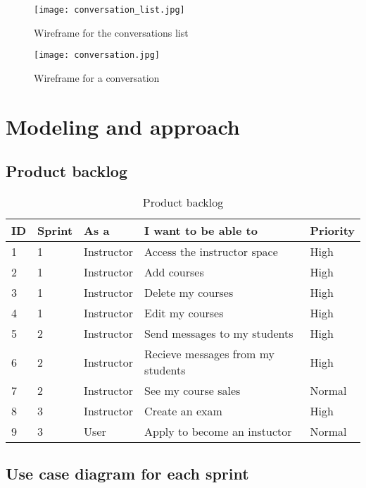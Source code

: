 \begin{figure}[!ht]
    \centering
    \texttt{[image: conversation\_list.jpg]}
    \caption{Wireframe for the conversations list}
    \label{fig:conversation_list}
\end{figure}


\vfill
\clearpage

\begin{figure}[!ht]
    \centering
    \texttt{[image: conversation.jpg]}
    \caption{Wireframe for a conversation}
    \label{fig:conversation}
\end{figure}


\section{Modeling and approach}

\subsection{Product backlog}
\begin{table}[H]
\centering
\caption{Product backlog}
\begin{tabular}{|p{1cm}|p{1.5cm}|p{3cm}|p{6cm}|p{2cm}|}
\hline
\rowcolor{brown!18}\textbf{\large{ID}} & \textbf{\large{Sprint}} & \textbf{\large{As a}}  & \textbf{\large{I want to be able to}} & \textbf{\large{Priority}} \\
\hline
1& 1 & Instructor & Access the instructor space & High\\\hline
2& 1 & Instructor & Add courses  & High\\\hline
3& 1 & Instructor & Delete my courses  & High\\\hline
4& 1& Instructor & Edit my courses  & High\\\hline
5& 2& Instructor & Send messages to my students & High\\\hline
6& 2& Instructor & Recieve messages from my students  & High\\\hline
7& 2& Instructor  & See my course sales & Normal \\\hline
8& 3& Instructor & Create an exam & High\\\hline
9& 3& User & Apply to become an instuctor  & Normal \\\hline
\end{tabular}
\end{table}


\subsection{Use case diagram for each sprint}

